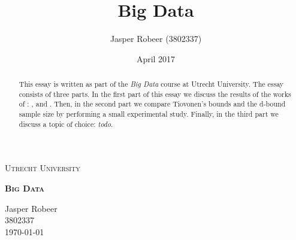 \documentclass[11pt, a4paper]{article}
\title{Big Data}
\author{Jasper Robeer (3802337)}
\date{April 2017}
\newcommand*{\customtitle}{\begingroup
    \thispagestyle{empty}
    \vspace*{1.25in}
    \centering
    {\scshape \large Utrecht University} \\[0.5\baselineskip]
    {\scshape \bfseries \Huge Big Data \par}
    \vfill
    \raggedleft
    {Jasper Robeer \\ 3802337} \\[\baselineskip]
    {\today}
    \clearpage
\endgroup}
\begin{document}
\customtitle

\begin{abstract}
    This essay is written as part of the \emph{Big Data} course at Utrecht University.
    The essay consists of three parts.
    In the first part of this essay we discuss the results of the works of \citeauthor{Riondato2012}: , and .
    Then, in the second part we compare Tiovonen's bounds and the d-bound sample size by performing a small experimental study.
    Finally, in the third part we discuss a topic of choice: \emph{todo}.
\end{abstract}





\printbibliography
\end{document}
